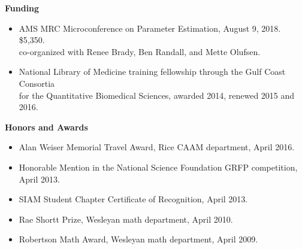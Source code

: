 \documentclass{article} %
\begin{document}
\vspace{0.5cm}
\noindent
{\bf \large Funding}
\begin{itemize}
\item AMS MRC Microconference on Parameter Estimation, August 9, 2018. \$5,350.\\
co-organized with Renee Brady, Ben Randall, and Mette Olufsen.
\item National Library of Medicine training fellowship through the Gulf Coast Consortia \\ for the Quantitative Biomedical Sciences, awarded 2014, renewed 2015 and 2016.
\end{itemize}


\vspace{0.5cm}
\noindent
{\bf \large Honors and Awards}
\begin{itemize}
\item Alan Weiser Memorial Travel Award, Rice CAAM department, April 2016.
\item Honorable Mention in the National Science Foundation GRFP competition, April 2013.
\item SIAM Student Chapter Certificate of Recognition, April 2013. 
\item Rae Shortt Prize, Wesleyan math department, April 2010. 
\item Robertson Math Award, Wesleyan math department, April 2009. 
\end{itemize}


\end{document}
